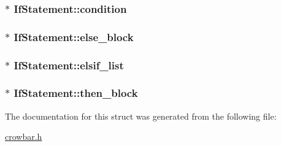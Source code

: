 \subsubsection[{condition}]{$\ast$ If\+Statement\+::condition}\label{struct_if_statement_a2f94ffdf006915378fd04adcca34decd}
\hypertarget{struct_if_statement_ab2fa316c9e48259809b33d1551a072fa}{}
\subsubsection[{else\+\_\+block}]{$\ast$ If\+Statement\+::else\+\_\+block}\label{struct_if_statement_ab2fa316c9e48259809b33d1551a072fa}
\hypertarget{struct_if_statement_a9fca446be841301fe78695d38c69f5e5}{}
\subsubsection[{elsif\+\_\+list}]{$\ast$ If\+Statement\+::elsif\+\_\+list}\label{struct_if_statement_a9fca446be841301fe78695d38c69f5e5}
\hypertarget{struct_if_statement_aa3ad1531bae5272926856f65fa9109a6}{}
\subsubsection[{then\+\_\+block}]{$\ast$ If\+Statement\+::then\+\_\+block}\label{struct_if_statement_aa3ad1531bae5272926856f65fa9109a6}


The documentation for this struct was generated from the following file\+:\begin{DoxyCompactItemize}
\item 
\hyperlink{crowbar_8h}{crowbar.\+h}\end{DoxyCompactItemize}
